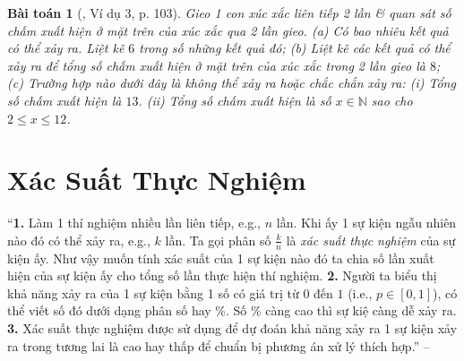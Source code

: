 \documentclass{article}
\numberwithin{equation}{section}
\newtheorem{baitoan}{Bài toán}
\begin{document}
\begin{baitoan}[\cite{Tuyen_Toan_6}, Ví dụ 3, p. 103]
	Gieo 1 con xúc xắc liên tiếp 2 lần \& quan sát số chấm xuất hiện ở mặt trên của xúc xắc qua 2 lần gieo. (a) Có bao nhiêu kết quả có thể xảy ra. Liệt kê $6$ trong số những kết quả đó; (b) Liệt kê các kết quả có thể xảy ra để tổng số chấm xuất hiện ở mặt trên của xúc xắc trong 2 lần gieo là $8$; (c) Trường hợp nào dưới đây là không thể xảy ra hoặc chắc chắn xảy ra: (i) Tổng số chấm xuất hiện là $13$. (ii) Tổng số chấm xuất hiện là số $x\in\mathbb{N}$ sao cho $2\le x\le12$.
\end{baitoan}


\section{Xác Suất Thực Nghiệm}
``\textbf{1.} Làm 1 thí nghiệm nhiều lần liên tiếp, e.g., $n$ lần. Khi ấy 1 sự kiện ngẫu nhiên nào đó có thể xảy ra, e.g., $k$ lần. Ta gọi phân số $\frac{k}{n}$ là \textit{xác suất thực nghiệm} của sự kiện ấy. Như vậy muốn tính xác suất của 1 sự kiện nào đó ta chia số lần xuất hiện của sự kiện ấy cho tổng số lần thực hiện thí nghiệm. \textbf{2.} Người ta biểu thị khả năng xảy ra của 1 sự kiện bằng 1 số có giá trị từ $0$ đến $1$ (i.e., $p\in[0,1]$), có thể viết số đó dưới dạng phân số hay \%. Số \% càng cao thì sự kiệ càng dễ xảy ra. \textbf{3.} Xác suất thực nghiệm được sử dụng để dự đoán khả năng xảy ra 1 sự kiện xảy ra trong tương lai là cao hay thấp để chuẩn bị phương án xử lý thích hợp.'' --  \cite[Chap. II, \S2, p. 104]{Tuyen_Toan_6}


\printbibliography[heading=bibintoc]
	
\end{document}
